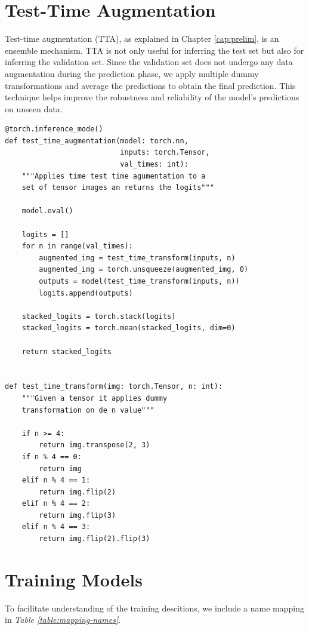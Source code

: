 \section{Test-Time Augmentation}

Test-time augmentation (TTA), as explained in Chapter \ref{cap:prelim}, is an
ensemble mechanism. TTA is not only useful for inferring the test set but also
for inferring the validation set. Since the validation set does not undergo any
data augmentation during the prediction phase, we apply multiple dummy
transformations and average the predictions to obtain the final prediction.
This technique helps improve the robustness and reliability of the model's
predictions on unseen data.

\begin{Verbatim}[fontsize=\scriptsize]
@torch.inference_mode()
def test_time_augmentation(model: torch.nn,
                           inputs: torch.Tensor,
                           val_times: int):
    """Applies time test time agumentation to a
    set of tensor images an returns the logits"""

    model.eval()

    logits = []
    for n in range(val_times):
        augmented_img = test_time_transform(inputs, n)
        augmented_img = torch.unsqueeze(augmented_img, 0)
        outputs = model(test_time_transform(inputs, n))
        logits.append(outputs)

    stacked_logits = torch.stack(logits)
    stacked_logits = torch.mean(stacked_logits, dim=0)

    return stacked_logits


def test_time_transform(img: torch.Tensor, n: int):
    """Given a tensor it applies dummy
    transformation on de n value"""

    if n >= 4:
        return img.transpose(2, 3)
    if n % 4 == 0:
        return img
    elif n % 4 == 1:
        return img.flip(2)
    elif n % 4 == 2:
        return img.flip(3)
    elif n % 4 == 3:
        return img.flip(2).flip(3)
\end{Verbatim}

\section{Training Models}

To facilitate understanding of the training descitions, we include a name
mapping in \textit{Table \ref{table:mapping-names}}.

